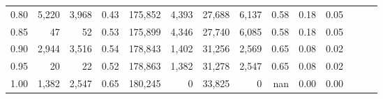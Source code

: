\begin{tabular}{rrrrrrrrrrrrrr}
0.80 &   5,220 &  3,968 &  0.43 &  175,852 &    4,393 &  27,688 &   6,137 &  0.58 &  0.18 &      0.05 \\
0.85 &      47 &     52 &  0.53 &  175,899 &    4,346 &  27,740 &   6,085 &  0.58 &  0.18 &      0.05 \\
0.90 &   2,944 &  3,516 &  0.54 &  178,843 &    1,402 &  31,256 &   2,569 &  0.65 &  0.08 &      0.02 \\
0.95 &      20 &     22 &  0.52 &  178,863 &    1,382 &  31,278 &   2,547 &  0.65 &  0.08 &      0.02 \\
1.00 &   1,382 &  2,547 &  0.65 &  180,245 &        0 &  33,825 &       0 &   nan &  0.00 &      0.00 \\
\bottomrule
\end{tabular}

